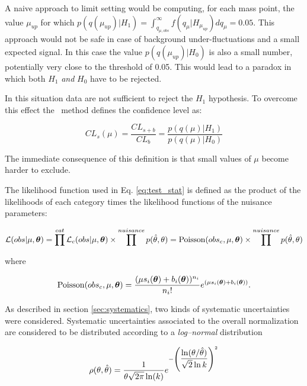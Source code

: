 A naive approach to limit setting would be computing, for each mass point, the value $\mu_{up}$ for which $p(q(\mu_{up}) | H_1) = \int_{q_{\mu,obs}}^{\infty}f(q_\mu|H_{\mu_{up}})dq_\mu = 0.05$. This approach would not be safe in case of background under-fluctuations and a small expected signal. In this case the value $p(q(\mu_{up}) | H_0)$ is also a small number, potentially very close to the threshold of 0.05. This would lead to a paradox in which both $H_1$ \emph{and} $H_0$ have to be rejected.

In this situation data are not sufficient to reject the $H_1$ hypothesis. To overcome this effect the \CLs\ method defines the confidence level as:

\begin{equation}
CL_s(\mu) = \dfrac{CL_{s+b}}{CL_b} = \dfrac{p(q(\mu) | H_1)}{p(q(\mu) | H_0)}
\end{equation}

The immediate consequence of this definition is that small values of $\mu$ become harder to exclude.

The likelihood function used in Eq. \ref{eq:test_stat} is defined as the product of the likelihoods of each category times the likelihood functions of the nuisance parameters:

\begin{equation}
\mathcal{L}(obs|\mu, \boldsymbol\theta) = \prod^{cat} \mathcal{L}_c(obs|\mu, \boldsymbol\theta) \times \prod^{nuisance} p(\hat{\theta},\theta) = \operatorname{Poisson}(obs_c, \mu, \boldsymbol\theta) \times \prod^{nuisance} p(\hat{\theta},\theta)
\end{equation}

where

\begin{equation}
\operatorname{Poisson}(obs_c, \mu, \boldsymbol\theta) = \dfrac{(\mu s_i(\boldsymbol\theta) + b_i(\boldsymbol\theta))^{n_i}}{n_i!}e^{(\mu s_i(\boldsymbol\theta) + b_i(\boldsymbol\theta))}.
\end{equation}

As described in section \ref{sec:systematics}, two kinds of systematic uncertainties were considered. Systematic uncertainties associated to the overall normalization are considered to be distributed according to a \emph{log--normal} distribution 

\begin{equation}
\rho(\theta, \hat{\theta}) = \dfrac{1}{\theta\sqrt{2\pi}\operatorname{ln}(k)} e^{-\left(\dfrac{\operatorname{ln}(\theta/\hat{\theta})}{\sqrt{2}\operatorname{ln}k}\right)^2}
\end{equation}

